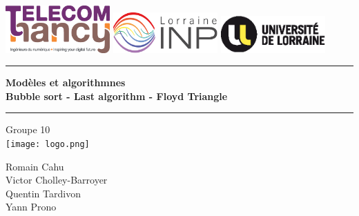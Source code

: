 \thispagestyle{empty}

{\color{primary}


\includegraphics[width=4.0cm]{img/school-logo.eps}
\hspace{9mm}
\includegraphics[width=4.0cm]{img/collegium-logo.eps}
\hspace{5mm}
\includegraphics[width=4.0cm]{img/university-logo.eps}

\vspace{0.5cm}

	\begin{center}


			{\color[rgb]{0.8,0.8,.8}\rule{\textwidth}{0.8pt}}
			\vspace{0.2cm}

			\baselineskip=3pt
			{\huge \bfseries{Modèles et algorithmnes}}\\
			\vspace{0.5cm}
			{\Large \bfseries{Bubble sort - Last algorithm - Floyd Triangle}}
			\vspace{0.5cm}

		{\color[rgb]{0.8,0.8,.8}\rule{\textwidth}{0.8pt}}

		\vspace{1cm}

		\Large{Groupe 10}\\

		\vspace{1cm}
		\texttt{[image: logo.png]}


		\vspace{2cm}

		\Large{Romain Cahu}\\
		\Large{Victor Cholley-Barroyer}\\
		\Large{Quentin Tardivon}\\
		\Large{Yann Prono}\\
		\vspace{1cm}
		\large{\schoolYear}
	\end{center}

}
